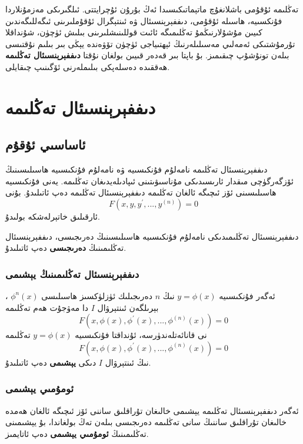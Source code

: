 \par\bigskip
\begin{tcolorbox}
تەڭلىمە ئۇقۇمى باشلانغۇچ ماتېماتىكىسىدا ئەڭ بۇرۇن ئۇچرايتتى. ئىلگىرىكى مەزمۇنلاردا فۇنكسىيە، ھاسىلە ئۇقۇمى، دىففېرېنسىئال ۋە ئىنتېگرال ئۇقۇملىرىنى ئىگەللىگەندىن كىيىن مۇشۇلارنىڭمۇ تەڭلىمىگە ئائىت قوللىنىشلىرىنى بىلىش ئۈچۈن، شۇنداقلا تۇرمۇشتىكى ئەمەلىي مەسىلىلەرنىڭ ئېھتىياجى ئۈچۈن تۆۋەندە يېڭى بىر بىلىم نۇقتىسى بىلەن تونۇشۇپ چىقىمىز. بۇ باپتا بىر قەدەر قىيىن بولغان نۇقتا
\textbf{دىففېرېنسىئال تەڭلىمە}
ھەققىدە دەسلەپكى بىلىملەرنى ئۆگىنىپ چىقايلى.

\end{tcolorbox}
\section{دىففېرېنسىئال تەڭلىمە}
\subsection{ئاساسىي ئۇقۇم}

\begin{MyDefinition}{دىففېرېنسىئال تەڭلىمە}{}
	نامەلۇم فۇنكىسىيە ۋە نامەلۇم فۇنكىسىيە ھاسىلىسىنىڭ ئۆزگەرگۈچى مىقدار ئارىسىدىكى مۇناسىۋىتىنى ئىپادىلەيدىغان تەڭلىمە. يەنى فۇنكىسىيە ھاسىلىسىنى ئۆز ئىچىگە ئالغان تەڭلىمە دىففېرېنسىئال تەڭلىمە دەپ ئاتىلىدۇ. بۇنى 
	$$F(x,y,y^{'},...,y^{(n)})=0$$
	ئارقىلىق خاتېرلەشكە بولىدۇ.
\end{MyDefinition}
دىففېرېنسىئال تەڭلىمىدىكى نامەلۇم فۇنكىسىيە ھاسىلىسىنىڭ دەرىجىسى، دىففېرېنسىئال تەڭلىمىنىڭ \textbf{دەرىجىسى} دەپ ئاتىلىدۇ.

\subsubsection{دىففېرېنسىئال تەڭلىمىنىڭ يېشىمى}
ئەگەر فۇنكىسىيە $y=\phi(x)$ نىڭ $n$ دەرىجىلىك ئۈزلۈكسىز ھاسىلىسى $\phi^n(x)$ ، بېرىلگەن ئىنتېرۋال $I$ دا مەۋجۇت ھەم تەڭلىمە
$$F(x,\phi(x),\phi^{'}(x),...,\phi^{(n)}(x))=0$$
نى قانائەتلەندۈرسە، ئۇنداقتا فۇنكىسىيە $y=\phi(x)$ تەڭلىمە
$$F(x,\phi(x),\phi^{'}(x),...,\phi^{(n)}(x))=0$$
نىڭ ئىنتېرۋال $I$ دىكى \textbf{يېشىمى} دەپ ئاتىلىدۇ. 
\subsubsection{ئومۇمىي يېشىمى}
ئەگەر دىففېرېنسىئال تەڭلىمە يېشىمى خالىغان تۇراقلىق ساننى ئۆز ئىچىگە ئالغان ھەمدە خالىغان تۇراقلىق ساننىڭ سانى تەڭلىمە دەرىجىسى بىلەن تەڭ بولغاندا، بۇ يېشىمىنى تەڭلىمىنىڭ \textbf{ئومۇمىي يېشىمى} دەپ ئاتايمىز.
